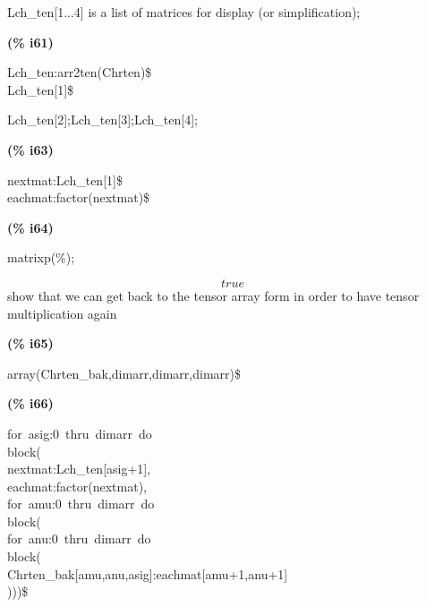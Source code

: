 \documentclass[fleqn]{article}
\begin{document}
\noindent%

Lch\_ten[1...4] is a list of matrices for display (or simplification);


\noindent
\begin{minipage}[t]{4.000000em}\color{red}\bfseries
(\% i61)	
\end{minipage}
\begin{minipage}[t]{\textwidth}\color{blue}
Lch\_ten:arr2ten(Chrten)\$\\
Lch\_ten[1]\$
\end{minipage}

\noindent%

Lch\_ten[2];Lch\_ten[3];Lch\_ten[4];


\noindent
\begin{minipage}[t]{4.000000em}\color{red}\bfseries
(\% i63)	
\end{minipage}
\begin{minipage}[t]{\textwidth}\color{blue}
nextmat:Lch\_ten[1]\$\\
eachmat:factor(nextmat)\$
\end{minipage}

\noindent%



\noindent
\begin{minipage}[t]{4.000000em}\color{red}\bfseries
(\% i64)	
\end{minipage}
\begin{minipage}[t]{\textwidth}\color{blue}
matrixp(\%);
\end{minipage}
\[\displaystyle \tag{\% o64} 
true\mbox{}
\]
show that we can get back to the tensor array form in order to have tensor multiplication again


\noindent
\begin{minipage}[t]{4.000000em}\color{red}\bfseries
(\% i65)	
\end{minipage}
\begin{minipage}[t]{\textwidth}\color{blue}
array(Chrten\_bak,dimarr,dimarr,dimarr)\$
\end{minipage}

\noindent%



\noindent
\begin{minipage}[t]{4.000000em}\color{red}\bfseries
(\% i66)	
\end{minipage}
\begin{minipage}[t]{\textwidth}\color{blue}
for\ asig:0\ thru\ dimarr\ do\\
block(\\
nextmat:Lch\_ten[asig+1],\\
eachmat:factor(nextmat),\\
for\ amu:0\ thru\ dimarr\ do\\
block(\\
for\ anu:0\ thru\ dimarr\ do\\
block(\\
Chrten\_bak[amu,anu,asig]:eachmat[amu+1,anu+1]\\
)))\$
\end{minipage}
\end{document}
